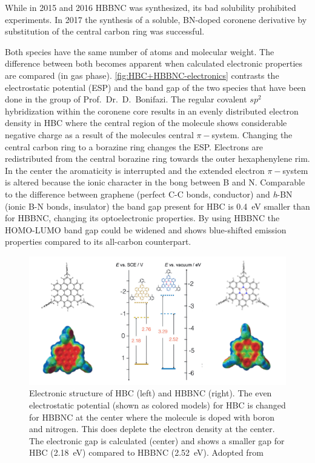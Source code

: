 While in 2015 \cite{Krieg_construction_2015} and 2016 \cite{Ciccullo_Quasi-Free-Standing_2016} HBBNC was synthesized, its bad solubility prohibited experiments. In 2017 the synthesis \cite{dosso_synthesis_2017} of a soluble, BN-doped coronene derivative by substitution of the central carbon ring was successful. 

Both species have the same number of atoms and molecular weight. The difference between both becomes apparent when calculated electronic properties are compared (in gas phase). \autoref{fig:HBC+HBBNC-electronics} contrasts the electrostatic potential (ESP) and the band gap of the two species that have been done in the group of Prof.\ Dr.\ D.\ Bonifazi.\cite{dosso_synthesis_2017} The regular covalent $sp^2$ hybridization within the coronene core results in an evenly distributed electron density in HBC where the central region of the molecule shows considerable negative charge as a result of the molecules central $\pi-$system. Changing the central carbon ring to a borazine ring changes the ESP. Electrons are redistributed from the central borazine ring towards the outer hexaphenylene rim. In the center the aromaticity is interrupted and the extended electron $\pi-$system is altered because the ionic character in the bong between B and N. Comparable to the difference between graphene (perfect C-C bonds, conductor) and \textit{h}-BN (ionic B-N bonds, insulator) the band gap present for HBC is \SI{0.4}{\eV} smaller than for HBBNC, changing its optoelectronic properties. By using HBBNC the HOMO-LUMO band gap could be widened and shows blue-shifted emission properties compared to its all-carbon counterpart.\cite{dosso_synthesis_2017} 

\begin{figure}[]\centering
	\includegraphics[width=\textwidth]{./images/dosso-combined}
	\caption{Electronic structure of HBC (left) and HBBNC (right). The even electrostatic potential (shown as colored models) for HBC is changed for HBBNC at the center where the molecule is doped with boron and nitrogen. This does deplete the electron density at the center. The electronic gap is calculated (center) and shows a smaller gap for HBC (\SI{2.18}{\eV}) compared to HBBNC (\SI{2.52}{\eV}). Adopted from \cite{dosso_synthesis_2017}}
	\label{fig:HBC+HBBNC-electronics}
\end{figure}

